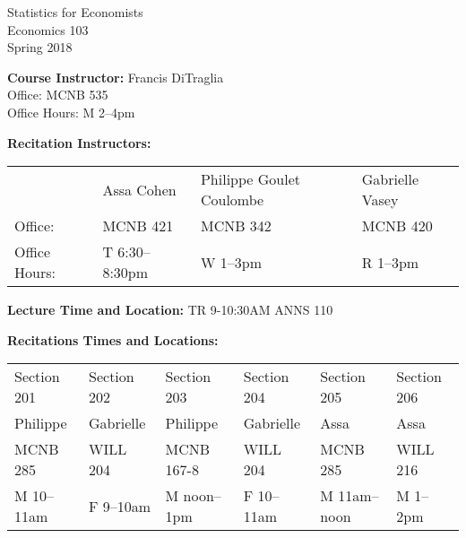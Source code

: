 \documentclass[11pt, letterpaper]{article}
\begin{document}
\thispagestyle{plain}

\begin{center}
\Large
\sc
Statistics for Economists\\
\large
Economics 103\\
\large
Spring 2018
\end{center}



\normalsize

\noindent \textbf{Course Instructor:} Francis DiTraglia \\
Office: MCNB 535\\
Office Hours: M 2--4pm 

\medskip


\noindent \textbf{Recitation Instructors:}

\medskip
\noindent

\begin{tabular}{llll}
  & Assa Cohen & Philippe Goulet Coulombe & Gabrielle Vasey\\
Office:& MCNB 421 & MCNB 342 & MCNB 420 \\ 
Office Hours:& T 6:30--8:30pm & W 1--3pm & R 1--3pm  
\end{tabular}

\medskip
 
\noindent \textbf{Lecture Time and Location:} TR 9-10:30AM ANNS 110 

\medskip

\noindent \textbf{Recitations Times and Locations:}
\medskip \noindent

\begin{tabular}{llllll}
	Section 201 & Section 202 & Section 203 & Section 204 & Section 205 & Section 206\\ 
  Philippe & Gabrielle & Philippe & Gabrielle & Assa & Assa\\
	MCNB 285 & WILL 204 & MCNB 167-8 & WILL 204 & MCNB 285 & WILL 216 \\ 
  M 10--11am & F 9--10am & M noon--1pm & F 10--11am & M 11am--noon & M 1--2pm
\end{tabular}


\medskip

%
\end{document}
